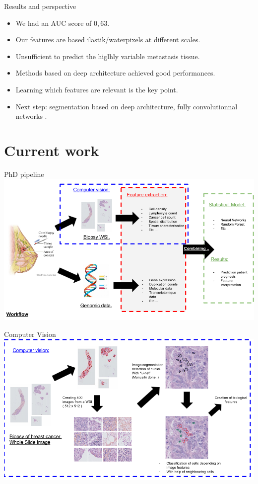 \documentclass{beamer}
\begin{document}
\begin{frame}{Results and perspective}
\begin{itemize}
\item We had an AUC score of $0,63$.
\item Our features are based ilastik/waterpixels at different scales.
\item Unsufficient to predict the higlhly variable metastasis tissue.
\item Methods based on deep architecture achieved good performances.
\item Learning which features are relevant is the key point.
\item Next step: segmentation based on deep architecture, fully convolutionnal networks .
\end{itemize}
\end{frame}


\section{Current work}

\begin{frame}{PhD pipeline}
\includegraphics[width=\textwidth]{Workflow_overview.png}
\end{frame}
\begin{frame}{Computer Vision}
\includegraphics[width=\textwidth]{ComputerVision.png}
\end{frame}
\end{document}
